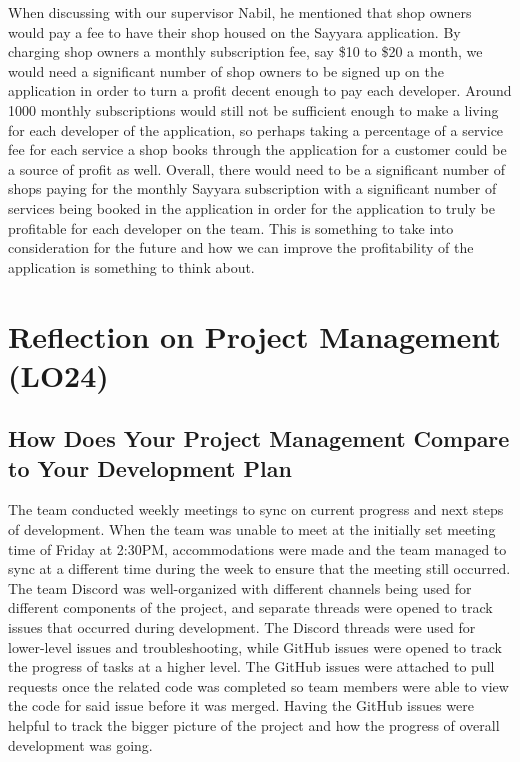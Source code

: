 \documentclass{article}
\begin{document}
\noindent When discussing with our supervisor Nabil, he mentioned that shop owners would pay a fee to have their shop housed on the Sayyara application. By charging shop owners a monthly subscription fee, say \$10 to \$20 a month, we would need a significant number of shop owners to be signed up on the
application in order to turn a profit decent enough to pay each developer. Around 1000 monthly subscriptions would still not be sufficient enough to make a
living for each developer of the application, so perhaps taking a percentage of a service fee for each service a shop books through the application for a
customer could be a source of profit as well. Overall, there would need to be a significant number of shops paying for the monthly Sayyara subscription with
a significant number of services being booked in the application in order for the application to truly be profitable for each developer on the team. This is
something to take into consideration for the future and how we can improve the profitability of the application is something to think about.

\section{Reflection on Project Management (LO24)}

\subsection{How Does Your Project Management Compare to Your Development Plan}

\noindent The team conducted weekly meetings to sync on current progress and next steps of development. When the team was unable to meet at the initially
set meeting time of Friday at 2:30PM, accommodations were made and the team managed to sync at a different time during the week to ensure that the meeting
still occurred. The team Discord was well-organized with different channels being used for different components of the project, and separate threads were
opened to track issues that occurred during development. The Discord threads were used for lower-level issues and troubleshooting, while GitHub issues were
opened to track the progress of tasks at a higher level. The GitHub issues were attached to pull requests once the related code was completed so team
members were able to view the code for said issue before it was merged. Having the GitHub issues were helpful to track the bigger picture of the project and
how the progress of overall development was going.\\
\end{document}
